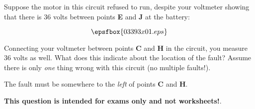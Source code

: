 

Suppose the motor in this circuit refused to run, despite your voltmeter showing that there is 36 volts between points {\bf E} and {\bf J} at the battery:

$$\epsfbox{03393x01.eps}$$

Connecting your voltmeter between points {\bf C} and {\bf H} in the circuit, you measure 36 volts as well.  What does this indicate about the location of the fault?  Assume there is only {\it one} thing wrong with this circuit (no multiple faults!).







The fault must be somewhere to the {\it left} of points {\bf C} and {\bf H}.







{\bf This question is intended for exams only and not worksheets!}.



